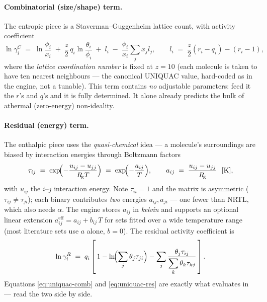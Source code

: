 \documentclass[11pt,a4paper]{article}
\newcommand{\Rgas}{R_{\!\mathrm{g}}}                %
\begin{document}
\paragraph{Combinatorial (size/shape) term.} The entropic piece is a
Staverman--Guggenheim lattice count, with activity coefficient
\begin{equation}
   \ln \gamma_i^{C}
   \;=\;
   \ln\!\frac{\phi_i}{x_i}
   \;+\; \frac{z}{2}\, q_i \ln\!\frac{\theta_i}{\phi_i}
   \;+\; l_i
   \;-\; \frac{\phi_i}{x_i}\sum_{j} x_j l_j,
   \qquad
   l_i \;=\; \frac{z}{2}(r_i - q_i) - (r_i - 1),
   \label{eq:uniquac-comb}
\end{equation}
where the \emph{lattice coordination number} is fixed at $z = 10$ (each
molecule is taken to have ten nearest neighbours --- the canonical
UNIQUAC value, hard-coded as  in the engine, not a
tunable). This term contains \emph{no} adjustable parameters: feed it the
$r$'s and $q$'s and it is fully determined. It alone already predicts the
bulk of athermal (zero-energy) non-ideality.

\paragraph{Residual (energy) term.} The enthalpic piece uses the
\emph{quasi-chemical} idea --- a molecule's surroundings are biased by
interaction energies through Boltzmann factors
\begin{equation}
   \tau_{ij} \;=\; \exp\!\Bigl(-\frac{u_{ij} - u_{jj}}{\Rgas T}\Bigr)
              \;=\; \exp\!\Bigl(-\frac{a_{ij}}{T}\Bigr),
   \qquad
   a_{ij} \;=\; \frac{u_{ij} - u_{jj}}{\Rgas}\ \ [\mathrm{K}],
   \label{eq:uniquac-tau}
\end{equation}
with $u_{ij}$ the $i$--$j$ interaction energy. Note $\tau_{ii} = 1$ and
the matrix is asymmetric ($\tau_{ij}\neq\tau_{ji}$); each binary
contributes \emph{two} energies $a_{ij}, a_{ji}$ --- one fewer than NRTL,
which also needs $\alpha$. The engine stores $a_{ij}$ in \emph{kelvin}
and supports an optional linear extension
$a^{\mathrm{eff}}_{ij} = a_{ij} + b_{ij}\,T$ for sets fitted over a wide
temperature range (most literature sets use $a$ alone, $b=0$). The
residual activity coefficient is
\begin{equation}
   \ln \gamma_i^{R}
   \;=\;
   q_i\left[\,1
   - \ln\!\Bigl(\sum_{j}\theta_j \tau_{ji}\Bigr)
   - \sum_{j}\frac{\theta_j \tau_{ij}}
                   {\displaystyle\sum_{k}\theta_k \tau_{kj}}
   \,\right].
   \label{eq:uniquac-res}
\end{equation}
Equations \eqref{eq:uniquac-comb} and \eqref{eq:uniquac-res} are exactly
what  evaluates in
 --- read the two side by side.
\end{document}
